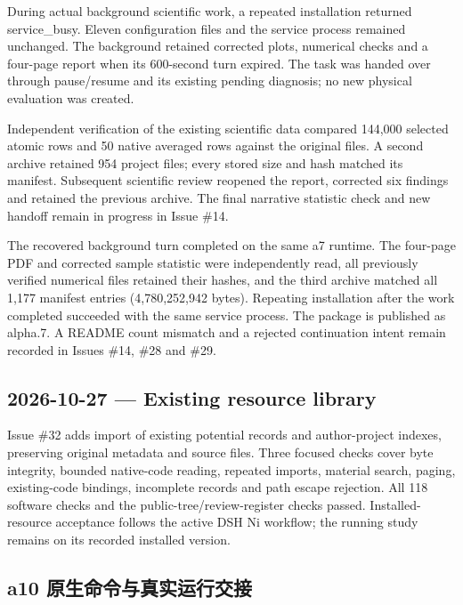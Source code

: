 \documentclass[11pt,a4paper]{ctexart}
\begin{document}
During actual background scientific work, a repeated installation returned service\_\allowbreak{}busy. Eleven configuration files and the service process remained unchanged. The background retained corrected plots, numerical checks and a four-page report when its 600-second turn expired. The task was handed over through pause/\allowbreak{}resume and its existing pending diagnosis; no new physical evaluation was created.



Independent verification of the existing scientific data compared 144,000 selected atomic rows and 50 native averaged rows against the original files. A second archive retained 954 project files; every stored size and hash matched its manifest. Subsequent scientific review reopened the report, corrected six findings and retained the previous archive. The final narrative statistic check and new handoff remain in progress in Issue \#14.



The recovered background turn completed on the same a7 runtime. The four-page PDF and corrected sample statistic were independently read, all previously verified numerical files retained their hashes, and the third archive matched all 1,177 manifest entries (4,780,252,942 bytes). Repeating installation after the work completed succeeded with the same service process. The package is published as alpha.7. A README count mismatch and a rejected continuation intent remain recorded in Issues \#14, \#28 and \#29.



\subsection{2026-10-27 — Existing resource library}


Issue \#32 adds import of existing potential records and author-project indexes, preserving original metadata and source files. Three focused checks cover byte integrity, bounded native-code reading, repeated imports, material search, paging, existing-code bindings, incomplete records and path escape rejection. All 118 software checks and the public-tree/\allowbreak{}review-register checks passed. Installed-resource acceptance follows the active DSH Ni workflow; the running study remains on its recorded installed version.



\subsection{a10 原生命令与真实运行交接}
\end{document}
